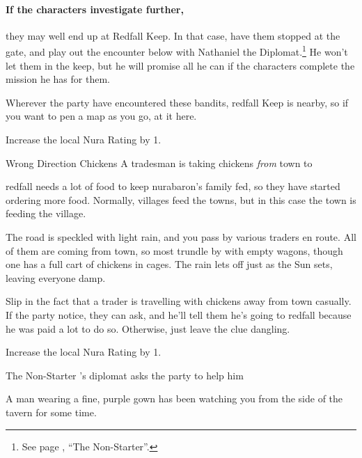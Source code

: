 \begin{multicols}{2}
\paragraph{If the characters investigate further,}
they may well end up at Redfall Keep.
In that case, have them stopped at the gate, and play out the encounter below with Nathaniel the Diplomat.\footnote{See page \pageref{nonstarter}, ``The Non-Starter''.}
He won't let them in the keep, but he will promise all he can if the characters complete the mission he has for them.

Wherever the party have encountered these bandits, \gls{redfall} Keep is nearby, so if you want to pen a map as you go, at it here.

Increase the local Nura Rating by 1.

{\N Wrong Direction Chickens}%
{A tradesman is taking chickens \emph{from} town to }%

\Gls{redfall} needs a lot of food to keep \gls{nurabaron}'s family fed, so they have started ordering more food.
Normally, villages feed the towns, but in this case the town is feeding the village.

\begin{boxtext}

	The road is speckled with light rain, and you pass by various traders en route.
	All of them are coming from town, so most trundle by with empty wagons, though one has a full cart of chickens in cages.
	The rain lets off just as the Sun sets, leaving everyone damp.

\end{boxtext}

Slip in the fact that a trader is travelling with chickens away from town casually.
If the party notice, they can ask, and he'll tell them he's going to \gls{redfall} because he was paid a lot to do so.
Otherwise, just leave the clue dangling.

Increase the local Nura Rating by 1.

\resumecontents[Town]

{The Non-Starter}%
{'s diplomat asks the party to help him}%
\label{nonstarter}

\stopcontents[Town]

\begin{boxtext}

	A man wearing a fine, purple gown has been watching you from the side of the tavern for some time.


\end{boxtext}
\end{multicols}
